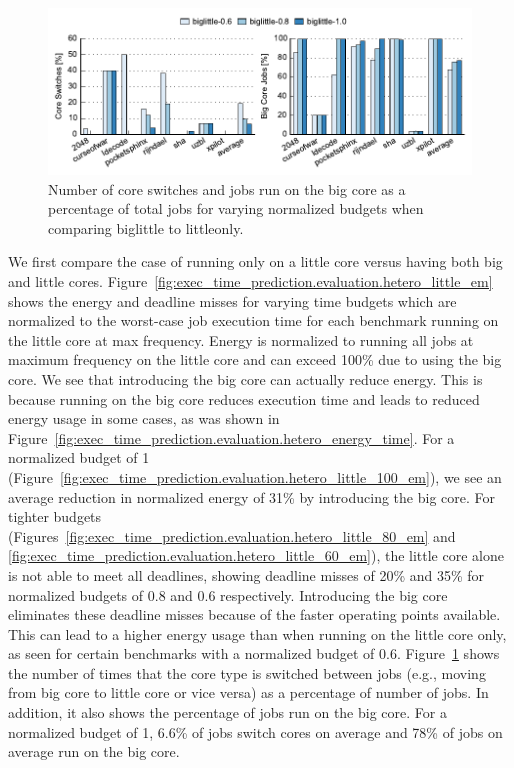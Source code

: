 \begin{figure}
  \begin{center}
    \includegraphics{exec_time_prediction/data/hetero_little_counts.pdf}
    \caption{Number of core switches and jobs run on the big core as a
    percentage of total jobs for varying normalized budgets when comparing
    biglittle to littleonly.}
    \label{fig:exec_time_prediction.evaluation.hetero_little_counts}
  \end{center}
\end{figure}

We first compare the case of running only on a little core versus having both
big and little cores.
Figure~\ref{fig:exec_time_prediction.evaluation.hetero_little_em} shows the
energy and deadline misses for varying time budgets which are normalized to the
worst-case job execution time for each benchmark running on the little core at
max frequency. Energy is normalized to running all jobs at maximum frequency on
the little core and can exceed 100\% due to using the big core. We see that
introducing the big core can actually reduce energy. This is because running on
the big core reduces execution time and leads to reduced energy usage in some cases, as was
shown in Figure~\ref{fig:exec_time_prediction.evaluation.hetero_energy_time}.
For a normalized budget of 1
(Figure~\ref{fig:exec_time_prediction.evaluation.hetero_little_100_em}), we see
an average reduction in normalized energy
of 31\% by introducing the big core. 
For tighter budgets
(Figures~\ref{fig:exec_time_prediction.evaluation.hetero_little_80_em} and
\ref{fig:exec_time_prediction.evaluation.hetero_little_60_em}), the little core
alone is not able to meet all deadlines, showing deadline
misses of 20\% and 35\% for normalized budgets of 0.8 and 0.6 respectively.
Introducing the big core eliminates these deadline misses because of the faster
operating points available.  This can lead to a higher energy usage than when
running on the little core only, as seen for certain benchmarks with a
normalized budget of 0.6.
Figure~\ref{fig:exec_time_prediction.evaluation.hetero_little_counts} shows the
number of 
times that the core type is switched between jobs (e.g., moving from big core
to little core or vice versa) as a percentage of number of jobs. In addition,
it also shows the percentage of jobs run on the big core. For a normalized
budget of 1, 6.6\% of jobs switch cores on average and 78\% of jobs on average
run on the big core.

